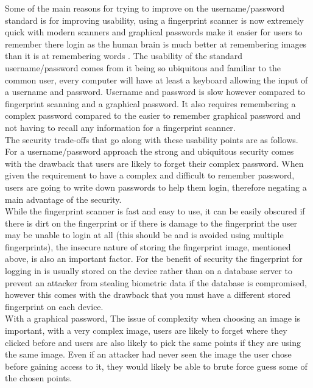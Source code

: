 \documentclass{ueacmpstyle}
\begin{document}
    Some of the main reasons for trying to improve on the username/password standard is for 
    improving usability, using a fingerprint scanner is now extremely quick with modern scanners 
    and graphical passwords make it easier for users to remember there login as the human 
    brain is much better at remembering images than it is at remembering words \citep{Grady2703}.
    The usability of the standard username/password comes from it being so ubiquitous and 
    familiar to the common user, every computer will have at least a keyboard allowing 
    the input of a username and password. Username and password is slow however compared to 
    fingerprint scanning and a graphical password. It also requires remembering a complex 
    password compared to the easier to remember graphical password and not having to recall 
    any information for a fingerprint scanner. 
    \\
    The security trade-offs that go along with these usability points are as follows. For 
    a username/password approach the strong and ubiquitous security comes with the drawback 
    that users are likely to forget their complex password. When given the requirement to 
    have a complex and difficult to remember password, users are going to write down 
    passwords to help them login, therefore negating a main advantage of the security.    
    \\
    While the fingerprint scanner is fast and easy to use, it can be easily obscured if 
    there is dirt on the fingerprint or if there is damage to the fingerprint the user may 
    be unable to login at all (this should be and is avoided using multiple fingerprints), 
    the insecure nature of storing the fingerprint image, mentioned above, is also an 
    important factor. 
    For the benefit of security the fingerprint for logging in is usually stored on the device 
    rather than on a database server to prevent an attacker from stealing biometric data if 
    the database is compromised, however this comes with the drawback that you must have a 
    different stored fingerprint on each device. 
    \\ 
    With a graphical password, The issue of complexity when choosing an image is important, 
    with a very complex image, users are likely to forget where they clicked before and users 
    are also likely to pick the same points if they are using the same image. Even if an 
    attacker had never seen the image the user chose before gaining access to it, they would 
    likely be able to brute force guess some of the chosen points.
\end{document}
